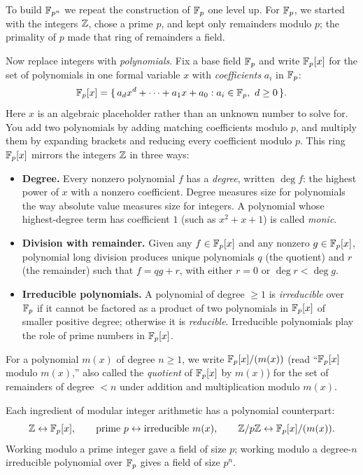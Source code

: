 To build $\mathbb{F}_{p^n}$ we repeat the construction of $\mathbb{F}_p$ one level up. For
$\mathbb{F}_p$, we started with the integers $\mathbb{Z}$, chose a prime $p$, and kept only
remainders modulo $p$; the primality of $p$ made that ring of remainders a
field.

Now replace integers with \emph{polynomials}. Fix a base field $\mathbb{F}_p$ and write
$\mathbb{F}_p[x]$ for the set of polynomials in one formal variable $x$ with
\emph{coefficients} $a_i$ in $\mathbb{F}_p$:
\[
\mathbb{F}_p[x] = \{\, a_{d}x^{d} + \cdots + a_1 x + a_0 : a_i \in \mathbb{F}_p,\ d \ge 0 \,\}.
\]
Here $x$ is an algebraic placeholder rather than an unknown number to solve
for. You add two polynomials by adding matching coefficients modulo $p$, and
multiply them by expanding brackets and reducing every coefficient modulo $p$.
This ring $\mathbb{F}_p[x]$ mirrors the integers $\mathbb{Z}$ in three ways:

\begin{itemize}
  \item \textbf{Degree.} Every nonzero polynomial $f$ has a \emph{degree},
        written $\deg f$: the highest power of $x$ with a nonzero coefficient.
        Degree measures size for polynomials the way absolute value measures
        size for integers. A polynomial whose highest-degree term has
        coefficient $1$ (such as $x^2 + x + 1$) is called \emph{monic}.
  \item \textbf{Division with remainder.} Given any $f \in \mathbb{F}_p[x]$ and any
        nonzero $g \in \mathbb{F}_p[x]$, polynomial long division produces unique
        polynomials $q$ (the quotient) and $r$ (the remainder) such that
        $f = qg + r$, with either $r = 0$ or $\deg r < \deg g$.
  \item \textbf{Irreducible polynomials.} A polynomial of degree $\ge 1$ is
        \emph{irreducible} over $\mathbb{F}_p$ if it cannot be factored as a product of
        two polynomials in $\mathbb{F}_p[x]$ of smaller positive degree; otherwise it
        is \emph{reducible}. Irreducible polynomials play the role of prime
        numbers in $\mathbb{F}_p[x]$.
\end{itemize}

For a polynomial $m(x)$ of degree $n \ge 1$, we write $\mathbb{F}_p[x]/(m(x))$ (read
``$\mathbb{F}_p[x]$ modulo $m(x)$,'' also called the \emph{quotient} of $\mathbb{F}_p[x]$ by
$m(x)$) for the set of remainders of degree $< n$ under addition and
multiplication modulo $m(x)$.

\begin{intuitionbox}
Each ingredient of modular integer arithmetic has a polynomial counterpart:
\[
\mathbb{Z} \leftrightarrow \mathbb{F}_p[x], \qquad
\text{prime } p \leftrightarrow \text{irreducible } m(x), \qquad
\mathbb{Z}/p\mathbb{Z} \leftrightarrow \mathbb{F}_p[x]/(m(x)).
\]
Working modulo a prime integer gave a field of size $p$; working modulo a
degree-$n$ irreducible polynomial over $\mathbb{F}_p$ gives a field of size $p^n$.
\end{intuitionbox}

